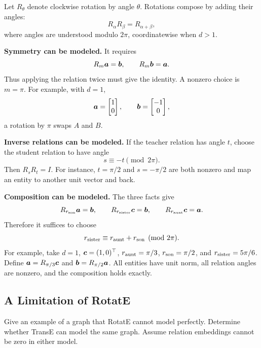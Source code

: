 \begin{solution}
Let \(R_{\theta}\) denote clockwise rotation by angle \(\theta\).  Rotations
compose by adding their angles:
\[
  R_{\alpha}R_{\beta}=R_{\alpha+\beta},
\]
where angles are understood modulo \(2\pi\), coordinatewise when \(d>1\).

\textbf{Symmetry can be modeled.}  It requires
\[
  R_m\bm{a}=\bm{b},
  \qquad
  R_m\bm{b}=\bm{a}.
\]
Thus applying the relation twice must give the identity.  A nonzero choice is
\(m=\pi\).  For example, with \(d=1\),
\[
  \bm{a}=\begin{bmatrix}1\\0\end{bmatrix},
  \qquad
  \bm{b}=\begin{bmatrix}-1\\0\end{bmatrix},
\]
a rotation by \(\pi\) swaps \(A\) and \(B\).

\textbf{Inverse relations can be modeled.}  If the teacher relation has
angle \(t\), choose the student relation to have angle
\[
  s\equiv -t\pmod{2\pi}.
\]
Then \(R_sR_t=I\).  For instance, \(t=\pi/2\) and \(s=-\pi/2\) are both
nonzero and map an entity to another unit vector and back.

\textbf{Composition can be modeled.}  The three facts give
\[
  R_{r_{\rm son}}\bm{a}=\bm{b},
  \qquad
  R_{r_{\rm sister}}\bm{c}=\bm{b},
  \qquad
  R_{r_{\rm aunt}}\bm{c}=\bm{a}.
\]
Therefore it suffices to choose
\[
  r_{\rm sister}
  \equiv r_{\rm aunt}+r_{\rm son}\pmod{2\pi}.
\]
For example, take \(d=1\), \(\bm{c}=(1,0)^\top\),
\(r_{\rm aunt}=\pi/3\), \(r_{\rm son}=\pi/2\), and
\(r_{\rm sister}=5\pi/6\).  Define \(\bm{a}=R_{\pi/3}\bm{c}\) and
\(\bm{b}=R_{\pi/2}\bm{a}\).  All entities have unit norm, all relation
angles are nonzero, and the composition holds exactly.
\end{solution}

\subsection{A Limitation of RotatE}

Give an example of a graph that RotatE cannot model perfectly. Determine
whether TransE can model the same graph. Assume relation embeddings cannot be
zero in either model.

